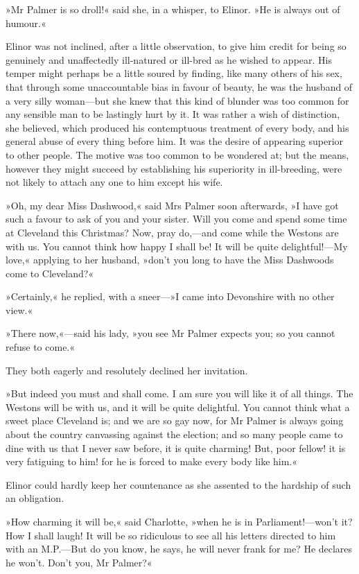 »Mr Palmer is so droll!« said she, in a whisper, to Elinor. »He is always out of humour.«

Elinor was not inclined, after a little observation, to give him credit for being so genuinely and unaffectedly ill-natured or ill-bred as he wished to appear. His temper might perhaps be a little soured by finding, like many others of his sex, that through some unaccountable bias in favour of beauty, he was the husband of a very silly woman—but she knew that this kind of blunder was too common for any sensible man to be lastingly hurt by it. It was rather a wish of distinction, she believed, which produced his contemptuous treatment of every body, and his general abuse of every thing before him. It was the desire of appearing superior to other people. The motive was too common to be wondered at; but the means, however they might succeed by establishing his superiority in ill-breeding, were not likely to attach any one to him except his wife.

»Oh, my dear Miss Dashwood,« said Mrs Palmer soon afterwards, »I have got such a favour to ask of you and your sister. Will you come and spend some time at Cleveland this Christmas? Now, pray do,—and come while the Westons are with us. You cannot think how happy I shall be! It will be quite delightful!—My love,« applying to her husband, »don’t you long to have the Miss Dashwoods come to Cleveland?«

»Certainly,« he replied, with a sneer—»I came into Devonshire with no other view.«

»There now,«—said his lady, »you see Mr Palmer expects you; so you cannot refuse to come.«

They both eagerly and resolutely declined her invitation.

»But indeed you must and shall come. I am sure you will like it of all things. The Westons will be with us, and it will be quite delightful. You cannot think what a sweet place Cleveland is; and we are so gay now, for Mr Palmer is always going about the country canvassing against the election; and so many people came to dine with us that I never saw before, it is quite charming! But, poor fellow! it is very fatiguing to him! for he is forced to make every body like him.«

Elinor could hardly keep her countenance as she assented to the hardship of such an obligation.

»How charming it will be,« said Charlotte, »when he is in Parliament!—won’t it? How I shall laugh! It will be so ridiculous to see all his letters directed to him with an M.P.—But do you know, he says, he will never frank for me? He declares he won’t. Don’t you, Mr Palmer?«

